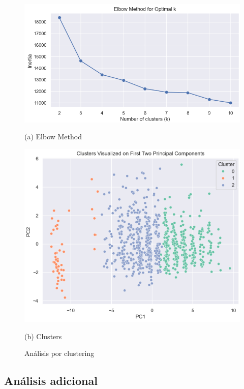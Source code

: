 \documentclass{article}
\begin{document}
\begin{figure}[h!]
  \centering
  \begin{minipage}[b]{0.45\textwidth}
      \centering
      \includegraphics[scale=0.40]{Elbow_Method.png}
      \caption*{(a) Elbow Method}
  \end{minipage}
  \hfill
  \begin{minipage}[b]{0.45\textwidth}
      \centering
      \includegraphics[scale=0.4]{Clusters.png}
      \caption*{(b) Clusters}
  \end{minipage}
  \caption{Análisis por clustering}
\end{figure}

\subsection{Análisis adicional}
\end{document}
